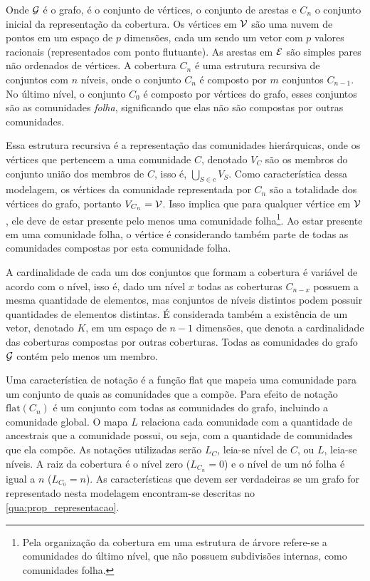 \documentclass[notes.tex]{subfiles}
\begin{document}
Onde $\operatorname{\mathcal{G}}$ é o grafo, \V é o conjunto de vértices, \E o conjunto de arestas e  $C_n$ o conjunto inicial da representação da cobertura.
Os vértices em $\operatorname{\mathcal{V}}$ são uma nuvem de pontos em um espaço de $p$ dimensões, cada um sendo um vetor com $p$ valores racionais (representados com ponto flutuante).
As arestas em $\operatorname{\mathcal{E}}$ são simples pares não ordenados de vértices.
A cobertura $C_n$ é uma estrutura recursiva de conjuntos com $n$ níveis, onde o conjunto $C_n$ é composto por $m$ conjuntos $C_{n-1}$.
No último nível, o conjunto $C_0$ é composto por vértices do grafo, esses conjuntos são as comunidades \emph{folha}, significando que elas não são compostas por outras comunidades.

Essa estrutura recursiva é a representação das comunidades hierárquicas, onde os vértices que pertencem a uma comunidade $C$, denotado $V_C$ são os membros do conjunto união dos membros de  $C$, isso é, $\bigcup_{S \in c} V_S$.
Como característica dessa modelagem, os vértices da comunidade representada por $C_n$ são a totalidade dos vértices do grafo, portanto $V_{C_n} = \operatorname{\mathcal{V}}$.
Isso implica que para qualquer vértice em $\operatorname{\mathcal{V}}$, ele deve de estar presente pelo menos uma comunidade folha\footnote{Pela organização da cobertura em uma estrutura de árvore refere-se a comunidades do último nível, que não possuem subdivisões internas, como comunidades folha.}.
Ao estar presente em uma comunidade folha, o vértice é considerando também parte de todas as comunidades compostas por esta comunidade folha.

A cardinalidade de cada um dos conjuntos que formam a cobertura é variável de acordo com o nível, isso é, dado um nível $x$ todas as coberturas  $C_{n-x}$ possuem a mesma quantidade de elementos, mas conjuntos de níveis distintos podem possuir quantidades de elementos distintas.
É considerada também a existência de um vetor, denotado $K$, em um espaço de $n-1$ dimensões, que denota a cardinalidade das coberturas compostas por outras coberturas.
Todas as comunidades do grafo $\operatorname{\mathcal{G}}$ contém pelo menos um membro.

Uma característica de notação é a função flat que mapeia uma comunidade para um conjunto de quais as comunidades que a compõe.
Para efeito de notação $\text{flat}(C_n)$ é um conjunto com todas as comunidades do grafo, incluindo a comunidade global.
O mapa $L$ relaciona cada comunidade com a quantidade de ancestrais que a comunidade possui, ou seja, com a quantidade de comunidades que ela compõe.
As notações utilizadas serão  $L_C$, leia-se nível de $C$, ou $L$, leia-se níveis.
A raiz da cobertura é o nível zero ($L_{C_n} = 0$) e o nível de um nó folha é igual a $n$ ($L_{C_0}=n$).
As características que devem ser verdadeiras se um grafo for representado nesta modelagem encontram-se descritas no \autoref{qua:prop_representacao}.
\end{document}
